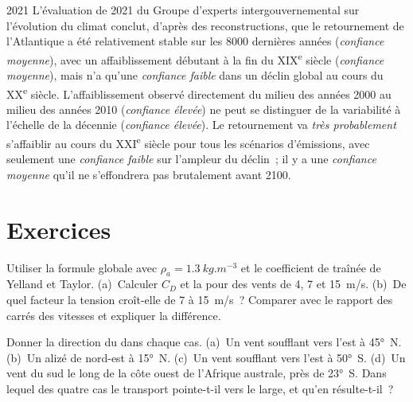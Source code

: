\begin{dated}{2021}
L'évaluation de 2021 du Groupe d'experts intergouvernemental sur l'évolution du climat conclut, d'après
des reconstructions, que le retournement de l'Atlantique a été relativement stable sur les
\num{8000} dernières années (\emph{confiance moyenne}), avec un affaiblissement débutant à la fin du
XIX\textsuperscript{e} siècle (\emph{confiance moyenne}), mais n'a qu'une \emph{confiance faible} dans un
déclin global au cours du XX\textsuperscript{e} siècle. L'affaiblissement observé directement du
milieu des années 2000 au milieu des années 2010 (\emph{confiance élevée}) ne peut se distinguer de
la variabilité à l'échelle de la décennie (\emph{confiance élevée}). Le retournement va \emph{très
probablement} s'affaiblir au cours du XXI\textsuperscript{e} siècle pour tous les scénarios d'émissions, avec seulement
une \emph{confiance faible} sur l'ampleur du déclin~; il y a une \emph{confiance moyenne}
qu'il ne s'effondrera pas brutalement avant 2100.
\end{dated}

\section{Exercices}

\begin{exercise}[$\star$]\label{exo:b1:ocean-circulation:1}
Utiliser la formule globale avec $\rho_a = \qty{1.3}{kg.m^{-3}}$ et le coefficient de traînée
de Yelland et Taylor. (a)~Calculer $C_D$ et la  pour des vents de 4, 7 et
\qty{15}{m/s}. (b)~De quel facteur la tension croît-elle de 7 à \qty{15}{m/s}~?
Comparer avec le rapport des carrés des vitesses et expliquer la différence.
\end{exercise}

\begin{exercise}[$\star$]\label{exo:b1:ocean-circulation:2}
Donner la direction du  dans chaque cas. (a)~Un vent soufflant vers
l'est à \ang{45}~N. (b)~Un alizé de nord-est à \ang{15}~N.
(c)~Un vent soufflant vers l'est à \ang{50}~S. (d)~Un vent du sud le long de
la côte ouest de l'Afrique australe, près de \ang{23}~S. Dans lequel des quatre cas
le transport pointe-t-il vers le large, et qu'en résulte-t-il~?
\end{exercise}

